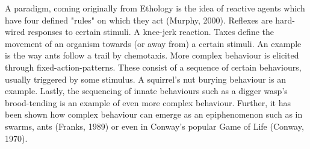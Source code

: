 A paradigm, coming originally from Ethology is the idea of reactive agents which have four defined "rules" on which they act (Murphy, 2000). Reflexes are hard-wired responses to certain stimuli. A knee-jerk reaction. Taxes
define the movement of an organism towards (or away from) a certain stimuli. An example is the way ants follow a trail by chemotaxis. More complex behaviour is elicited through fixed-action-patterns. These consist of a sequence of certain behaviours, usually triggered by some stimulus. A squirrel's nut burying behaviour is an example. Lastly, the sequencing of innate behaviours such as a digger wasp's brood-tending is an example of even more complex behaviour. Further, it has been shown how complex behaviour can emerge as an epiphenomenon such as in swarms, ants (Franks, 1989) or even in Conway's popular Game of Life (Conway, 1970).



